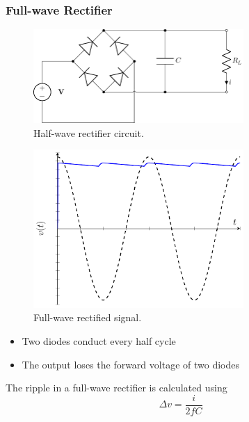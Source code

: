 \documentclass{article}
\begin{document}
\subsubsection{Full-wave Rectifier}
\begin{figure}[H]
    \centering
    \includegraphics[width = 8cm, keepaspectratio = true]{figures/full_wave_rectifier.pdf}
    \caption{Half-wave rectifier circuit.}
\end{figure}
\begin{figure}[H]
    \centering
    \includegraphics[width = 8cm, keepaspectratio = true]{figures/full_wave_rectifier_plot.pdf}
    \caption{Full-wave rectified signal.}
\end{figure}
\begin{itemize}
    \item Two diodes conduct every half cycle
    \item The output loses the forward voltage of two diodes
\end{itemize}
The ripple in a full-wave rectifier is calculated using
\begin{equation*}
    \Delta v = \frac{i}{2fC}
\end{equation*}
\end{document}
